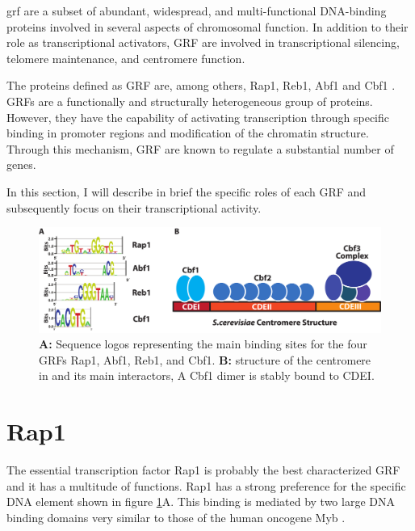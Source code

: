\gls{grf} are a subset of abundant, widespread, and multi-functional DNA-binding proteins involved in several aspects of chromosomal function. 
In addition to their role as transcriptional activators, GRF are involved in transcriptional silencing, telomere maintenance, and centromere function.

The proteins defined as GRF are, among others, Rap1, Reb1, Abf1 and Cbf1 \cite{diffley:1992:global}. 
GRFs are a functionally and structurally heterogeneous group of proteins. 
However, they have the capability of activating transcription through specific binding in promoter regions and modification of the chromatin structure. 
Through this mechanism, GRF are known to regulate a substantial number of genes.

In this section, I will describe in brief the specific roles of each GRF and subsequently focus on their transcriptional activity.

\begin{figure}[ht]

\centering
\includegraphics[width=\textwidth]{figures/introduction/grfCentromere}
\caption[GRFs binding sites and \cer{} centromere structure]{\textbf{A:} Sequence logos representing the main binding sites for the four GRFs Rap1, Abf1, Reb1, and Cbf1. \textbf{B:} structure of the centromere in \cer{} and its main interactors, A Cbf1 dimer is stably bound to CDEI.}
\label{fig:grfCentromere}

\end{figure}

\section{Rap1}

The essential transcription factor Rap1 is probably the best characterized GRF and it has a multitude of functions. 
Rap1 has a strong preference for the specific DNA element shown in figure \ref{fig:grfCentromere}A. This binding is mediated by two large DNA binding domains very similar to those of the human oncogene Myb \cite{rhee:2011:comprehensive}. 

